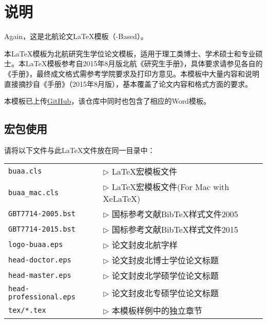 \chapter{说明}

Again，这是北航论文\LaTeX{}模板（\CTeX{}-Based）\BUAAThesis{}。

本\LaTeX{}模板为北航研究生学位论文模板，适用于理工类博士、学术硕士和专业硕士。本\LaTeX{}模板参考自2015年8月版北航《研究生手册》，具体要求请参见各自的《手册》，最终成文格式需参考学院要求及打印方意见。本模板中大量内容和说明直接摘抄自《手册》（2015年8月版），基本覆盖了论文内容和格式方面的要求。

本模板已上传\href{https://github.com/CheckBoxStudio/BUAAThesis}{GitHub}，该仓库中同时也包含了相应的Word模板。

\section{宏包使用}

请将以下文件与此LaTeX文件放在同一目录中：

\begin{tabular}{ll}
 \verb|buaa.cls |             & $\triangleright$ LaTeX宏模板文件 \\
 \verb|buaa_mac.cls |         & $\triangleright$ LaTeX宏模板文件(For Mac with XeLaTeX) \\
 \verb|GBT7714-2005.bst|      & $\triangleright$ 国标参考文献BibTeX样式文件2005 \\
 \verb|GBT7714-2015.bst|      & $\triangleright$ 国标参考文献BibTeX样式文件2015 \\
 \verb|logo-buaa.eps|         & $\triangleright$ 论文封皮北航字样 \\
 \verb|head-doctor.eps|       & $\triangleright$ 论文封皮北博士学位论文标题\\
 \verb|head-master.eps|       & $\triangleright$ 论文封皮北学硕学位论文标题 \\
 \verb|head-professional.eps| & $\triangleright$ 论文封皮北专硕学位论文标题\\
 \verb|tex/*.tex|             & $\triangleright$ 本模板样例中的独立章节\\
\end{tabular}\\

